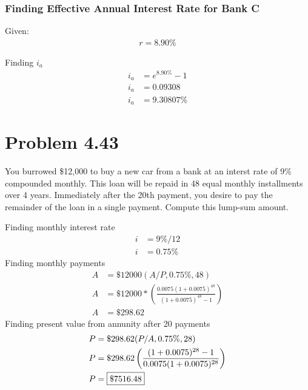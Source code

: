 \documentclass[../INDE250HW.tex]{subfiles}
\begin{document}
\subsubsection*{Finding Effective Annual Interest Rate for Bank C}
Given:
\begin{equation*}
    \begin{aligned}
        r = 8.90\%
    \end{aligned}
\end{equation*}

\noindent
Finding $i_a$
\begin{equation*}
    \begin{aligned}
        i_a &= e^{8.90\%} - 1 \\
        i_a &= 0.09308 \\
        i_a &= 9.30807\%
    \end{aligned}
\end{equation*}

\newpage
\section*{Problem 4.43}
\begin{exrc}
    You burrowed \$12,000 to buy a new car from a bank at an interst rate of 9\% compounded monthly. This loan will be repaid in 48 equal monthly installments over 4 years. Immediately after the 20th payment, you desire to pay the remainder of the loan in a single payment. Compute this lump-sum amount.
\end{exrc}
Finding monthly interest rate
\begin{equation*}
    \begin{aligned}
        i &= 9\%/12 \\
        i &= 0.75\%
    \end{aligned}
\end{equation*}
Finding monthly payments 
\begin{equation*}
    \begin{aligned}
        A &= \$12000(A/P, 0.75\%, 48) \\
        A &= \$12000*\left(\frac{0.0075(1+0.0075)^{48}}{(1+0.0075)^{48}-1}\right) \\
        A &= \$298.62
    \end{aligned}
\end{equation*}
Finding present value from annunity after 20 payments
\begin{equation*}
    \begin{aligned}
        P &= \$298.62(P/A,0.75\%,28) \\
        P &= \$298.62\left(\frac{(1+0.0075)^{28}-1}{0.0075(1+0.0075)^{28}}\right) \\
        P &= \framebox{$\$7516.48$}
    \end{aligned}
\end{equation*}
\end{document}
